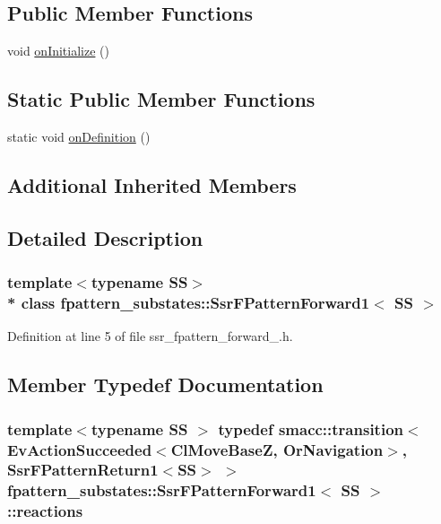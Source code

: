 \subsection*{Public Member Functions}
\begin{DoxyCompactItemize}
\item 
void \hyperlink{structfpattern__substates_1_1SsrFPatternForward1_a0e77a0cfda5eb78c46194942528aa3d6}{on\+Initialize} ()
\end{DoxyCompactItemize}
\subsection*{Static Public Member Functions}
\begin{DoxyCompactItemize}
\item 
static void \hyperlink{structfpattern__substates_1_1SsrFPatternForward1_a2da7d74b298449089088a15736520b6a}{on\+Definition} ()
\end{DoxyCompactItemize}
\subsection*{Additional Inherited Members}


\subsection{Detailed Description}
\subsubsection*{template$<$typename SS$>$\\*
class fpattern\+\_\+substates\+::\+Ssr\+F\+Pattern\+Forward1$<$ S\+S $>$}



Definition at line 5 of file ssr\+\_\+fpattern\+\_\+forward\+\_.\+h.



\subsection{Member Typedef Documentation}
\subsubsection[{\texorpdfstring{reactions}{reactions}}]{\setlength{\rightskip}{0pt plus 5cm}template$<$typename SS $>$ typedef {\bf smacc\+::transition}$<$Ev\+Action\+Succeeded$<$Cl\+Move\+BaseZ, Or\+Navigation$>$, {\bf Ssr\+F\+Pattern\+Return1}$<$SS$>$ $>$ {\bf fpattern\+\_\+substates\+::\+Ssr\+F\+Pattern\+Forward1}$<$ SS $>$\+::{\bf reactions}}\hypertarget{structfpattern__substates_1_1SsrFPatternForward1_a2fb7fbee29ff3305db7e77d87449fb9e}{}\label{structfpattern__substates_1_1SsrFPatternForward1_a2fb7fbee29ff3305db7e77d87449fb9e}


